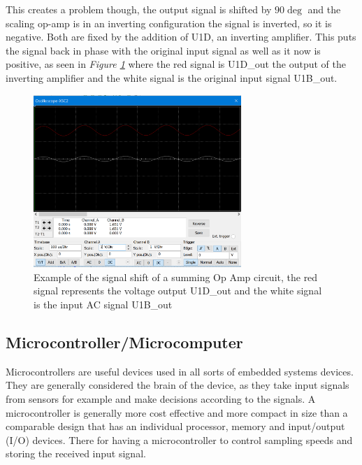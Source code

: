 This creates a problem though, the output signal is shifted by $90\deg$ and the scaling op-amp is in an inverting configuration the signal is inverted, so it is negative.
Both are fixed by the addition of U1D, an inverting amplifier.
This puts the signal back in phase with the original input signal as well as it now is positive, as seen in \textit{Figure \ref{fig:SummingOpAmpShift1}} where the red signal is U1D\_out the output of the inverting amplifier and the white signal is the original input signal U1B\_out.

\begin{figure}[h]
    \centering
    \includegraphics[width=0.70\textwidth]{graphics/summingShift1.png}
    \caption{Example of the signal shift of a summing Op Amp circuit, the red signal represents the voltage output U1D\_out and the white signal is the input AC signal U1B\_out}
    \label{fig:SummingOpAmpShift1}
\end{figure}

\vspace{6cm}


\subsection{Microcontroller/Microcomputer}%

Microcontrollers are useful devices used in all sorts of embedded systems devices.
They are generally considered the brain of the device, as they take input signals from sensors for example and make decisions according to the signals.
A microcontroller is generally more cost effective and more compact in size than a comparable design that has an individual processor, memory and input/output (I/O) devices.
There for having a microcontroller to control sampling speeds and storing the received input signal.

